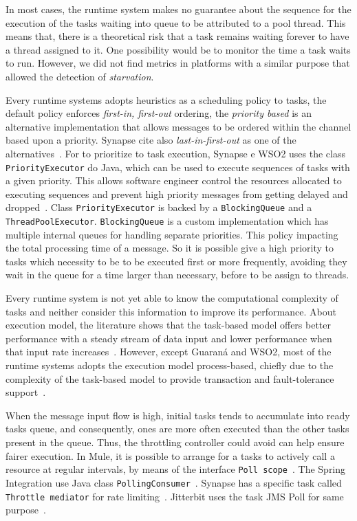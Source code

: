 In most cases, the runtime system makes no guarantee about the sequence for the execution of the tasks waiting into queue to be attributed to a pool thread. This means that, there is a theoretical risk that a task remains waiting forever to have a thread assigned to it. One possibility would be to monitor the time a task waits to run. However, we did not find metrics in platforms with a similar purpose that allowed the detection of \textit{starvation}.

Every runtime systems adopts heuristics as a scheduling policy to tasks, the default policy enforces \textit{first-in, first-out} ordering, the \textit{priority based} is an alternative implementation that allows messages to be ordered within the channel based upon a priority. Synapse cite also \textit{last-in-first-out} as one of the alternatives~\cite{Snapse1}. For to prioritize to task execution, Synapse e WSO2 uses the class \texttt{PriorityExecutor} do Java, which can be used to execute sequences of tasks with a given priority. This allows software engineer control the resources allocated to executing sequences and prevent high priority messages from getting delayed and dropped~\cite{WSO2}. Class \texttt{PriorityExecutor} is backed by a \texttt{BlockingQueue} and a \texttt{ThreadPoolExecutor}. \texttt{BlockingQueue} is a custom implementation which has multiple internal queues for handling separate priorities. This policy impacting the total processing time of a message. So it is possible give a high priority to tasks which necessity to be to be executed first or more frequently, avoiding they wait in the queue for a time larger than necessary, before to be assign to threads.

Every runtime system is not yet able to know the computational complexity of tasks and neither consider this information to improve its performance. About execution model, the literature shows that the task-based model offers better performance with a steady stream of data input and lower performance when that input rate increases~\cite{frantz2011}. However, except Guaraná and WSO2, most of the runtime systems adopts the execution model process-based, chiefly due to the complexity of the task-based model to provide transaction and fault-tolerance support~\cite{frantz2012}. 

When the message input flow is high, initial tasks tends to accumulate into ready tasks queue, and consequently, ones are more often executed than the other tasks present in the queue. Thus, the throttling controller could avoid can help ensure fairer execution. In Mule, it is possible to arrange for a tasks to actively call a resource at regular intervals, by means of the interface \texttt{Poll scope}~\cite{Mule}. The Spring Integration use Java class \texttt{PollingConsumer}~\cite{Spring}. Synapse has a specific task called \texttt{Throttle mediator} for rate limiting~\cite{Snapse}. Jitterbit uses the task JMS Poll for same purpose~\cite{Jitterbit}.

